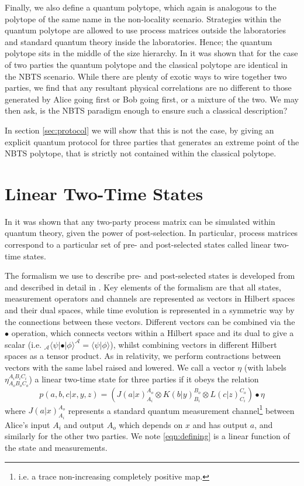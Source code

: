 \documentclass[aps,pra, twocolumn]{revtex4-1}
\newcommand{\bra}[1]{\langle #1|}
\newcommand{\ket}[1]{|#1\rangle}
\newcommand{\inner}[2]{\langle #1 | #2 \rangle}
\begin{document}
Finally, we also define a quantum polytope, which again is analogous to the polytope of the same name in the non-locality scenario. Strategies within the quantum polytope are allowed to use process matrices outside the laboratories and standard quantum theory inside the laboratories. Hence; the quantum polytope sits in the middle of the size hierarchy. In \cite{polytope} it was shown that for the case of two parties the quantum polytope and the classical polytope are identical in the NBTS scenario.  While there are plenty of exotic ways to wire together two parties, we find that any resultant physical correlations are no different to those generated by Alice going first or Bob going first, or a mixture of the two. We may then ask, is the NBTS paradigm enough to ensure such a classical description? 

In section \ref{sec:protocol} we will show that this is not the case, by giving an explicit quantum protocol for three parties that generates an extreme point of the NBTS polytope, that is strictly not contained within the classical polytope. 

\section{Linear Two-Time States}

In \cite{connectingprocesandtwotime} it was shown that any two-party process matrix can be simulated within quantum theory, given the power of post-selection. In particular, process matrices correspond to a particular set of pre- and post-selected states called linear two-time states. 


 The formalism we use to describe pre- and post-selected states is developed from \cite{Aharonov1964, Aharonov2009, Silva2014} and described in detail in \cite{connectingprocesandtwotime}. Key elements of the formalism are that all states, measurement operators and channels are represented as vectors in Hilbert spaces and their dual spaces, while time evolution is represented in a symmetric way by the connections between these vectors.
 Different vectors can be combined via the $\bullet$ operation, which connects vectors within a Hilbert space 
and its dual to give a scalar (i.e. $_{\mathcal{A}}\bra{\psi} \bullet \ket{\phi}^{\mathcal{A}} = \inner{\psi}{\phi}$), whilst combining vectors
in different Hilbert spaces as a tensor product. As in relativity, we perform contractions between vectors with the same label raised and lowered. We  call a vector $\eta$ (with labels $\eta^{A_i B_i C_i}_{A_o B_o C_o} $) a  linear two-time state  for three parties if it obeys the relation
  \begin{equation}
 p(a,b,c|x,y,z)=\left( J(a|x)^{A_o}_{A_i}  \otimes K(b|y)^{B_o}_{B_i} \otimes L(c|z)^{C_o}_{C_i}  \right) \bullet  \eta \label{eqn:defining}
 \end{equation}
where $J(a|x)^{A_o}_{A_i}$ represents a standard quantum measurement channel\footnote{i.e. a trace non-increasing completely positive map.} between Alice's input $A_i$ and output $A_o$  which depends on $x$ and has output $a$, and similarly for the other two parties. We note \eqref{eqn:defining} is a linear function of the state and measurements. 
\end{document}
